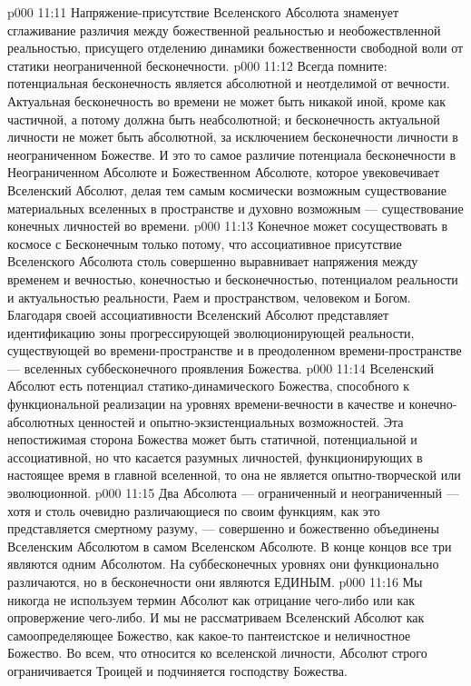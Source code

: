 \vs p000 11:11 \pc Напряжение\hyp{}присутствие Вселенского Абсолюта знаменует сглаживание различия между божественной реальностью и необожествленной реальностью, присущего отделению динамики божественности свободной воли от статики неограниченной бесконечности.
\vs p000 11:12 \pc Всегда помните: потенциальная бесконечность является абсолютной и неотделимой от вечности. Актуальная бесконечность во времени не может быть никакой иной, кроме как частичной, а потому должна быть неабсолютной; и бесконечность актуальной личности не может быть абсолютной, за исключением бесконечности личности в неограниченном Божестве. И это то самое различие потенциала бесконечности в Неограниченном Абсолюте и Божественном Абсолюте, которое увековечивает Вселенский Абсолют, делая тем самым космически возможным существование материальных вселенных в пространстве и духовно возможным --- существование конечных личностей во времени.
\vs p000 11:13 Конечное может сосуществовать в космосе с Бесконечным только потому, что ассоциативное присутствие Вселенского Абсолюта столь совершенно выравнивает напряжения между временем и вечностью, конечностью и бесконечностью, потенциалом реальности и актуальностью реальности, Раем и пространством, человеком и Богом. Благодаря своей ассоциативности Вселенский Абсолют представляет идентификацию зоны прогрессирующей эволюционирующей реальности, существующей во времени\hyp{}пространстве и в преодоленном времени\hyp{}пространстве --- вселенных суббесконечного проявления Божества.
\vs p000 11:14 Вселенский Абсолют есть потенциал статико\hyp{}динамического Божества, способного к функциональной реализации на уровнях времени\hyp{}вечности в качестве и конечно\hyp{}абсолютных ценностей и опытно\hyp{}экзистенциальных возможностей. Эта непостижимая сторона Божества может быть статичной, потенциальной и ассоциативной, но что касается разумных личностей, функционирующих в настоящее время в главной вселенной, то она не является опытно\hyp{}творческой или эволюционной.
\vs p000 11:15 \pc {} Два Абсолюта --- ограниченный и неограниченный --- хотя и столь очевидно различающиеся по своим функциям, как это представляется смертному разуму, --- совершенно и божественно объединены Вселенским Абсолютом в самом Вселенском Абсолюте. В конце концов все три являются одним Абсолютом. На суббесконечных уровнях они функционально различаются, но в бесконечности они являются ЕДИНЫМ.
\vs p000 11:16 \pc Мы никогда не используем термин Абсолют как отрицание чего\hyp{}либо или как опровержение чего\hyp{}либо. И мы не рассматриваем Вселенский Абсолют как самоопределяющее Божество, как какое\hyp{}то пантеистское и неличностное Божество. Во всем, что относится ко вселенской личности, Абсолют строго ограничивается Троицей и подчиняется господству Божества.
